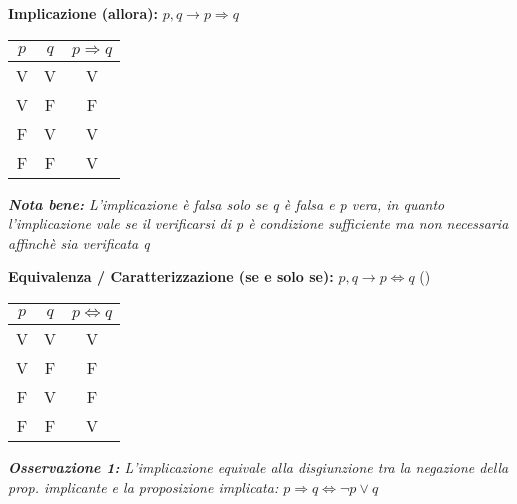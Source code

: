 \documentclass[10pt]{article}
\theoremstyle{plain}
\begin{document}
\begin{description}
\begin{center}
\begin{tabular}{c|c|c}
       \end{tabular}  \end{center}
 \item[$\ast$] \textbf{Implicazione (allora):} $p, q \longrightarrow p \Rightarrow q$
   \item \begin{center} \begin{tabular}{c|c|c}
        $p$ & $q$ & $p \Rightarrow q$  \\
        \hline  V  & V & V \\ V & F & F \\ F & V & V \\ F & F & V
         \end{tabular}  \end{center}
    \item \textit{\textbf{Nota bene:} L'implicazione è falsa solo se q è falsa e p vera, in quanto l'implicazione vale se il verificarsi di p è condizione sufficiente ma non necessaria affinchè sia verificata q}
 \item[$\ast$] \textbf{Equivalenza / Caratterizzazione (se e solo se):} $p, q \longrightarrow p \Leftrightarrow q$ (\*)
   \item \begin{center} \begin{tabular}{c|c|c}
        $p$ & $q$ & $p \Leftrightarrow q$  \\
        \hline  V  & V & V \\ V & F & F \\ F & V & F \\ F & F & V 
       \end{tabular}  \end{center}
    \item \textit{\textbf{Osservazione 1:} L'implicazione equivale alla disgiunzione tra la negazione della prop. implicante e la proposizione implicata: $p \Rightarrow q \Longleftrightarrow \neg p \lor q$}
\end{description}
\end{document}
